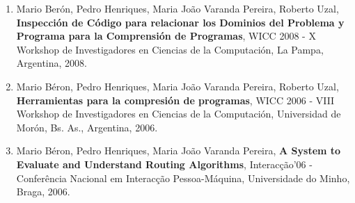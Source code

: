 \documentclass[11pt]{article}
\begin{document}
\begin{enumerate}
\item{Mario Berón, Pedro Henriques, Maria João Varanda Pereira, Roberto Uzal, {
\bf{ Inspección de Código para relacionar los Dominios del Problema y Programa para la Comprensión de Programas}}, WICC 2008 - X Workshop de Investigadores en Ciencias de la Computación, La Pampa, Argentina, 2008. }
\item{Mario Béron, Pedro Henriques, Maria João Varanda Pereira, Roberto Uzal, {
\bf{ Herramientas para la compresión de programas}}, WICC 2006 - VIII Workshop de Investigadores en Ciencias de la Computación, Universidad de Morón, Bs. As., Argentina, 2006. }
\item{Mario Béron, Pedro Henriques, Maria João Varanda Pereira, {
\bf{ A System to Evaluate and Understand Routing Algorithms}}, Interacção'06 - Conferência Nacional em Interacção Pessoa-Máquina, Universidade do Minho, Braga, 2006. }
\end{enumerate}
\end{document}
